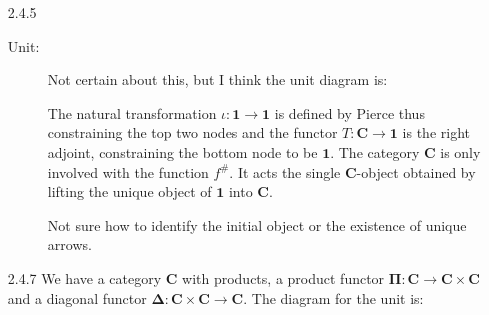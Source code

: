 \documentclass{article}
\newcommand{\one}{\mathbf{1}}
\newcommand{\cat}{\mathbf{C}}
\newcommand{\pifun}{\mathbf{\Pi}}
\newcommand{\diagfun}{\mathbf{\Delta}}
\begin{document}
\begin{enumerate}
\item [2.4.5]
  \begin{description}
  \item [Unit:]
    Not certain about this, but I think the unit diagram is:
    \begin{center}
    \end{center}
    The natural transformation $\iota : \one \rightarrow \one$ is defined by Pierce thus constraining the top two nodes and the functor $T : \cat \rightarrow \one$ is the right adjoint, constraining the bottom node to be $\one$.
    The category $\cat$ is only involved with the function $f^{\#}$.
    It acts the single $\cat$-object obtained by lifting the unique object of $\one$ into $\cat$.

    Not sure how to identify the initial object or the existence of unique arrows.
  \end{description}
\item[]
\item[2.4.7]
  We have a category $\cat$ with products, a product functor $\pifun : \cat \rightarrow \cat \times \cat$ and a diagonal functor $\diagfun : \cat \times \cat \rightarrow \cat$.
  The diagram for the unit is:
  \begin{center}
\end{center}
\end{enumerate}
\end{document}
